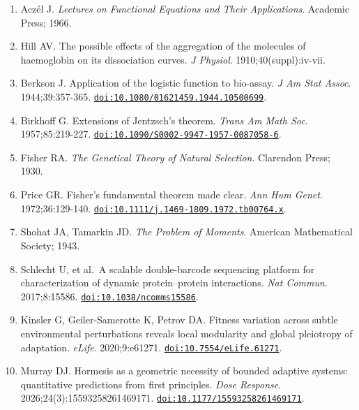 \documentclass[
  11pt,
  a4paper,
]{article}
\providecommand{\tightlist}{%
  \setlength{\itemsep}{0pt}\setlength{\parskip}{0pt}}
\begin{document}
\begin{enumerate}
\def\labelenumi{\arabic{enumi}.}
\tightlist
\item
  Aczél J. \emph{Lectures on Functional Equations and Their Applications}. Academic Press; 1966.
\item
  Hill AV. The possible effects of the aggregation of the molecules of haemoglobin on its dissociation curves. \emph{J Physiol}. 1910;40(suppl):iv-vii.
\item
  Berkson J. Application of the logistic function to bio-assay. \emph{J Am Stat Assoc}. 1944;39:357-365. \href{https://doi.org/10.1080/01621459.1944.10500699}{\nolinkurl{doi:10.1080/01621459.1944.10500699}}.
\item
  Birkhoff G. Extensions of Jentzsch's theorem. \emph{Trans Am Math Soc}. 1957;85:219-227. \href{https://doi.org/10.1090/S0002-9947-1957-0087058-6}{\nolinkurl{doi:10.1090/S0002-9947-1957-0087058-6}}.
\item
  Fisher RA. \emph{The Genetical Theory of Natural Selection}. Clarendon Press; 1930.
\item
  Price GR. Fisher's fundamental theorem made clear. \emph{Ann Hum Genet}. 1972;36:129-140. \href{https://doi.org/10.1111/j.1469-1809.1972.tb00764.x}{\nolinkurl{doi:10.1111/j.1469-1809.1972.tb00764.x}}.
\item
  Shohat JA, Tamarkin JD. \emph{The Problem of Moments}. American Mathematical Society; 1943.
\item
  Schlecht U, et al.~A scalable double-barcode sequencing platform for characterization of dynamic protein--protein interactions. \emph{Nat Commun}. 2017;8:15586. \href{https://doi.org/10.1038/ncomms15586}{\nolinkurl{doi:10.1038/ncomms15586}}.
\item
  Kinsler G, Geiler-Samerotte K, Petrov DA. Fitness variation across subtle environmental perturbations reveals local modularity and global pleiotropy of adaptation. \emph{eLife}. 2020;9:e61271. \href{https://doi.org/10.7554/eLife.61271}{\nolinkurl{doi:10.7554/eLife.61271}}.
\item
  Murray DJ. Hormesis as a geometric necessity of bounded adaptive systems: quantitative predictions from first principles. \emph{Dose Response}. 2026;24(3):15593258261469171. \href{https://doi.org/10.1177/15593258261469171}{\nolinkurl{doi:10.1177/15593258261469171}}.
\end{enumerate}
\end{document}
